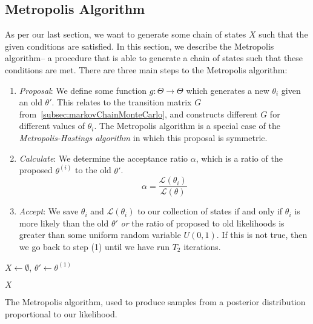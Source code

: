 \subsection{Metropolis Algorithm}\label{subsec:metropolisAlgorithm}
As per our last section, we want to generate some chain of states $X$ such that the given conditions are satisfied.
In this section, we describe the Metropolis algorithm-- a procedure that is able to generate a chain of states such that
these conditions are met.
There are three main steps to the Metropolis algorithm:
\begin{enumerate}
    \item \emph{Proposal}: We define some function $g : \Theta \rightarrow \Theta$ which generates a new $\theta_i$
        given an old $\theta'$.
        This relates to the transition matrix $G$ from~\autoref{subsec:markovChainMonteCarlo}, and constructs different
        $G$ for different values of $\theta_i$.
        The Metropolis algorithm is a special case of the \emph{Metropolis-Hastings algorithm} in which this proposal is
        symmetric.
    \item \emph{Calculate}: We determine the acceptance ratio $\alpha$, which is a ratio of the proposed $\theta^{(i)}$
        to the old $\theta'$.
    \begin{equation}
        \alpha = \frac{\mathcal{L}(\theta_i)}{\mathcal{L}(\theta)}
    \end{equation}
    \item \emph{Accept}: We save $\theta_i$ and $\mathcal{L}(\theta_i)$ to our collection of states if and only if
        $\theta_i$ is more likely than the old $\theta'$ \emph{or} the ratio of proposed to old likelihoods is greater
        than some uniform random variable $U(0, 1)$.
        If this is not true, then we go back to step (1) until we have run $T_2$ iterations.
\end{enumerate}

\begin{algorithm}[t]
    \SetAlgoLined
    \DontPrintSemicolon
     {
        $X \gets \emptyset$, $\theta' \gets \theta^{(1)}$ \;

        \Return $X$ \;
    }
    \caption{The Metropolis algorithm, used to produce samples from a posterior distribution proportional to our
    likelihood.}
    \label{alg:metropolis}
\end{algorithm}

